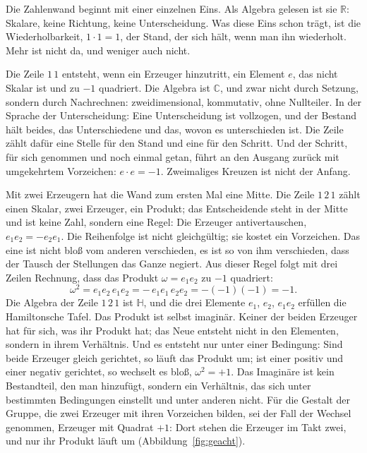 \documentclass[11pt,a4paper]{article}
\newcommand{\R}{\mathbb R}
\newcommand{\C}{\mathbb C}
\newcommand{\HH}{\mathbb H}
\begin{document}
Die Zahlenwand beginnt mit einer einzelnen Eins. Als Algebra gelesen ist sie $\R$: Skalare, keine Richtung, keine Unterscheidung. Was diese Eins schon trägt, ist die Wiederholbarkeit, $1\cdot1=1$, der Stand, der sich hält, wenn man ihn wiederholt. Mehr ist nicht da, und weniger auch nicht.

Die Zeile $1\,1$ entsteht, wenn ein Erzeuger hinzutritt, ein Element $e$, das nicht Skalar ist und zu $-1$ quadriert. Die Algebra ist $\C$, und zwar nicht durch Setzung, sondern durch Nachrechnen: zweidimensional, kommutativ, ohne Nullteiler. In der Sprache der Unterscheidung: Eine Unterscheidung ist vollzogen, und der Bestand hält beides, das Unterschiedene und das, wovon es unterschieden ist. Die Zeile zählt dafür eine Stelle für den Stand und eine für den Schritt. Und der Schritt, für sich genommen und noch einmal getan, führt an den Ausgang zurück mit umgekehrtem Vorzeichen: $e\cdot e=-1$. Zweimaliges Kreuzen ist nicht der Anfang.

Mit zwei Erzeugern hat die Wand zum ersten Mal eine Mitte. Die Zeile $1\,2\,1$ zählt einen Skalar, zwei Erzeuger, ein Produkt; das Entscheidende steht in der Mitte und ist keine Zahl, sondern eine Regel: Die Erzeuger antivertauschen, $e_1e_2=-e_2e_1$. Die Reihenfolge ist nicht gleichgültig; sie kostet ein Vorzeichen. Das eine ist nicht bloß vom anderen verschieden, es ist so von ihm verschieden, dass der Tausch der Stellungen das Ganze negiert. Aus dieser Regel folgt mit drei Zeilen Rechnung, dass das Produkt $\omega=e_1e_2$ zu $-1$ quadriert:
\begin{equation}
  \omega^2=e_1e_2\,e_1e_2=-\,e_1e_1\,e_2e_2=-(-1)(-1)=-1 .
\end{equation}
Die Algebra der Zeile $1\,2\,1$ ist $\HH$, und die drei Elemente $e_1$, $e_2$, $e_1e_2$ erfüllen die Hamiltonsche Tafel. Das Produkt ist selbst imaginär. Keiner der beiden Erzeuger hat für sich, was ihr Produkt hat; das Neue entsteht nicht in den Elementen, sondern in ihrem Verhältnis. Und es entsteht nur unter einer Bedingung: Sind beide Erzeuger gleich gerichtet, so läuft das Produkt um; ist einer positiv und einer negativ gerichtet, so wechselt es bloß, $\omega^2=+1$. Das Imaginäre ist kein Bestandteil, den man hinzufügt, sondern ein Verhältnis, das sich unter bestimmten Bedingungen einstellt und unter anderen nicht. Für die Gestalt der Gruppe, die zwei Erzeuger mit ihren Vorzeichen bilden, sei der Fall der Wechsel genommen, Erzeuger mit Quadrat $+1$: Dort stehen die Erzeuger im Takt zwei, und nur ihr Produkt läuft um (Abbildung~\ref{fig:geacht}).
\end{document}
